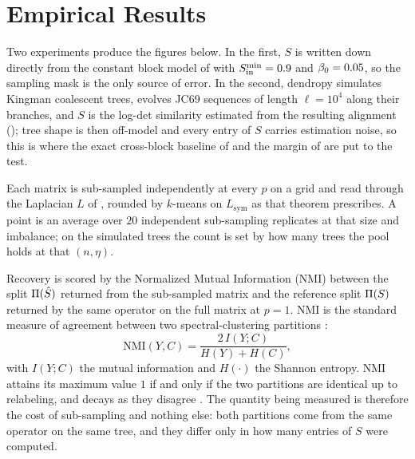 \section{Empirical Results}\label{sec:empirical}

Two experiments produce the figures below. In the first, $S$ is written down directly from the constant block model of  with $S_{\mathrm{in}}^{\min}=0.9$ and $\beta_0=0.05$, so the sampling mask is the only source of error. In the second, dendropy simulates Kingman coalescent trees, evolves JC69 sequences of length $\ell=10^4$ along their branches, and $S$ is the log-det similarity estimated from the resulting alignment (); tree shape is then off-model and every entry of $S$ carries estimation noise, so this is where the exact cross-block baseline of  and the margin of  are put to the test.

Each matrix is sub-sampled independently at every $p$ on a grid and read through the Laplacian $L$ of , rounded by $k$-means on $L_{\mathrm{sym}}$ as that theorem prescribes. A point is an average over $20$ independent sub-sampling replicates at that size and imbalance; on the simulated trees the count is set by how many trees the pool holds at that $(n,\eta)$.

Recovery is scored by the Normalized Mutual Information (NMI) between the split $\Pi(\hat S)$ returned from the sub-sampled matrix and the reference split $\Pi(S)$ returned by the same operator on the full matrix at $p=1$. NMI is the standard measure of agreement between two spectral-clustering partitions \cite{fortunato2010community, qinrohe2013regularized}:
\begin{equation}\label{eq:nmi_def}
   \mathrm{NMI}(Y,C)=\frac{2\,I(Y;C)}{H(Y)+H(C)},
\end{equation}
with $I(Y;C)$ the mutual information and $H(\cdot)$ the Shannon entropy. NMI attains its maximum value $1$ if and only if the two partitions are identical up to relabeling, and decays as they disagree \cite{strehlghosh2002cluster, fortunato2010community}. The quantity being measured is therefore the cost of sub-sampling and nothing else: both partitions come from the same operator on the same tree, and they differ only in how many entries of $S$ were computed.


